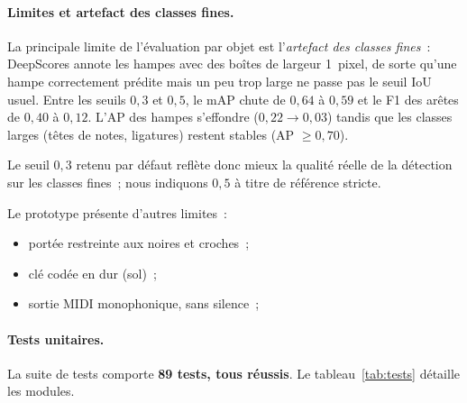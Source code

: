 \documentclass[a4paper,10pt]{article}
\begin{document}
\paragraph{Limites et artefact des classes fines.}\label{sec:thin}
La principale limite de l'évaluation par objet est l'\emph{artefact des classes fines}~: DeepScores annote les hampes avec des boîtes de largeur 1~pixel, de sorte qu'une hampe correctement prédite mais un peu trop large ne passe pas le seuil IoU usuel. Entre les seuils $0{,}3$ et $0{,}5$, le mAP chute de $0{,}64$ à $0{,}59$ et le F1 des arêtes de $0{,}40$ à $0{,}12$. L'AP des hampes s'effondre ($0{,}22 \to 0{,}03$) tandis que les classes larges (têtes de notes, ligatures) restent stables (AP $\geq 0{,}70$).

Le seuil $0{,}3$ retenu par défaut reflète donc mieux la qualité réelle de la détection sur les classes fines~; nous indiquons $0{,}5$ à titre de référence stricte.

Le prototype présente d'autres limites~:
\begin{itemize}
    \item portée restreinte aux noires et croches~;
    \item clé codée en dur (sol)~;
    \item sortie MIDI monophonique, sans silence~;
\end{itemize}

\paragraph{Tests unitaires.}
La suite de tests comporte \textbf{89 tests, tous réussis}. Le tableau~\ref{tab:tests} détaille les modules.
\end{document}
